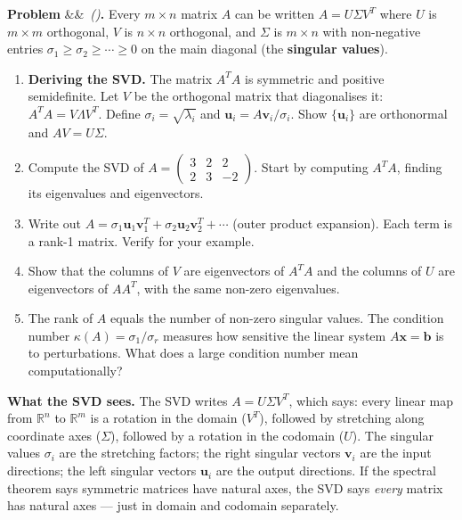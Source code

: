 \documentclass[12pt,a4paper]{article}
\newcounter{problem}
\newenvironment{problem}[1][]{\refstepcounter{problem}\par\vspace{6pt}\noindent\textbf{\color{MidBlue}Problem \theproblem}\ifx&#1&\else\ \textit{(#1)}\fi\textbf{.}\enskip}{\par\vspace{4pt}}
\begin{document}
\begin{problem}
Every $m\times n$ matrix $A$ can be written $A = U\Sigma V^T$ where $U$ is $m\times m$ orthogonal, $V$ is $n\times n$ orthogonal, and $\Sigma$ is $m\times n$ with non-negative entries $\sigma_1\geq\sigma_2\geq\cdots\geq 0$ on the main diagonal (the \textbf{singular values}).

\begin{enumerate}[label=(\alph*),topsep=2pt]
  \item \textbf{Deriving the SVD.} The matrix $A^TA$ is symmetric and positive semidefinite. Let $V$ be the orthogonal matrix that diagonalises it: $A^TA = V\Lambda V^T$. Define $\sigma_i = \sqrt{\lambda_i}$ and $\mathbf{u}_i = A\mathbf{v}_i/\sigma_i$. Show $\{\mathbf{u}_i\}$ are orthonormal and $AV = U\Sigma$.
  \item Compute the SVD of $A = \begin{pmatrix}3&2&2\\2&3&-2\end{pmatrix}$. Start by computing $A^TA$, finding its eigenvalues and eigenvectors.
  \item Write out $A = \sigma_1\mathbf{u}_1\mathbf{v}_1^T + \sigma_2\mathbf{u}_2\mathbf{v}_2^T + \cdots$ (outer product expansion). Each term is a rank-1 matrix. Verify for your example.
  \item Show that the columns of $V$ are eigenvectors of $A^TA$ and the columns of $U$ are eigenvectors of $AA^T$, with the same non-zero eigenvalues.
  \item The rank of $A$ equals the number of non-zero singular values. The condition number $\kappa(A) = \sigma_1/\sigma_r$ measures how sensitive the linear system $A\mathbf{x}=\mathbf{b}$ is to perturbations. What does a large condition number mean computationally?
\end{enumerate}
\end{problem}

\begin{thought}
\textbf{What the SVD sees.}
The SVD writes $A = U\Sigma V^T$, which says: every linear map from $\mathbb{R}^n$ to $\mathbb{R}^m$ is a rotation in the domain ($V^T$), followed by stretching along coordinate axes ($\Sigma$), followed by a rotation in the codomain ($U$). The singular values $\sigma_i$ are the stretching factors; the right singular vectors $\mathbf{v}_i$ are the input directions; the left singular vectors $\mathbf{u}_i$ are the output directions. If the spectral theorem says symmetric matrices have natural axes, the SVD says \emph{every} matrix has natural axes --- just in domain and codomain separately.
\end{thought}
\end{document}
